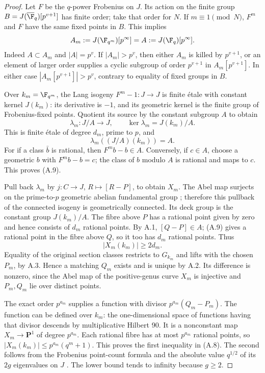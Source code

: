 \begin{proof}
Let $F$ be the $q$-power Frobenius on $J$. Its action on the
finite group $B=J(\overline{\F}_q)[p^{v+1}]$ has finite order;
take that order for $N$. If $m\equiv1\pmod N$, $F^m$ and $F$
have the same fixed points in $B$. This implies
\[
 A_m:=J(\F_{q^m})[p^\infty]=A:=J(\F_q)[p^\infty].
\]
Indeed $A\subset A_m$ and $|A|=p^v$. If $|A_m|>p^v$, then
either $A_m$ is killed by $p^{v+1}$, or an element of larger
order supplies a cyclic subgroup of order $p^{v+1}$ in
$A_m[p^{v+1}]$. In either case $|A_m[p^{v+1}]|>p^v$, contrary
to equality of fixed groups in $B$.

Over $k_m=\F_{q^m}$, the Lang isogeny $F^m-1:J\to J$ is
finite \'etale with constant kernel $J(k_m)$: its derivative
is $-1$, and its geometric kernel is the finite group of
Frobenius-fixed points. Quotient its source by the constant
subgroup $A$ to obtain
\[
 \lambda_m:J/A\longrightarrow J,
 \qquad\ker\lambda_m=J(k_m)/A.
\]
This is finite \'etale of degree $d_m$, prime to $p$, and
\[
 \lambda_m((J/A)(k_m))=A.                                       \tag{A.9}
\]
For if a class $\bar b$ is rational, then $F^m b-b\in A$.
Conversely, if $c\in A$, choose a geometric $b$ with
$F^m b-b=c$; the class of $b$ modulo $A$ is rational and
maps to $c$. This proves (A.9).

Pull back $\lambda_m$ by $j:C\to J$, $R\mapsto[R-P]$, to
obtain $X_m$. The Abel map surjects on the prime-to-$p$
geometric abelian fundamental group
\citep[III, Proposition 9.1 and \S9]{A_Milne2008}; therefore
this pullback of the connected isogeny is geometrically
connected. Its deck group is the constant group $J(k_m)/A$.
The fibre above $P$ has a rational point given by zero and
hence consists of $d_m$ rational points. By A.1,
$[Q-P]\in A$; (A.9) gives a rational point in the fibre above
$Q$, so it too has $d_m$ rational points. Thus
\[
 |X_m(k_m)|\ge2d_m.
\]
Equality of the original section classes restricts to $G_{k_m}$
and lifts with the chosen $P_m$, by A.3. Hence a matching
$Q_m$ exists and is unique by A.2. Its difference is nonzero,
since the Abel map of the positive-genus curve $X_m$ is
injective and $P_m,Q_m$ lie over distinct points.

The exact order $p^{a_m}$ supplies a function with divisor
$p^{a_m}(Q_m-P_m)$. The function can be defined over $k_m$:
the one-dimensional space of functions having that divisor
descends by multiplicative Hilbert 90. It is a nonconstant
map $X_m\to\mathbf P^1$ of degree $p^{a_m}$. Each rational
fibre has at most $p^{a_m}$ rational points, so
$|X_m(k_m)|\le p^{a_m}(q^m+1)$. This proves the first
inequality in (A.8). The second follows from the Frobenius
point-count formula and the absolute value $q^{1/2}$ of its
$2g$ eigenvalues on $J$ \citep[II, Theorem 1.1]{A_Milne2008}.
The lower bound tends to infinity because $g\ge2$.
\end{proof}

